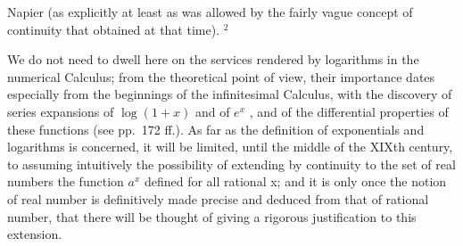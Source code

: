 Napier (as explicitly at least as was allowed by the fairly vague concept of continuity that obtained at that time). \(^{2}\)

We do not need to dwell here on the services rendered by logarithms in the numerical Calculus; from the theoretical point of view, their importance dates especially from the beginnings of the infinitesimal Calculus, with the discovery of series expansions of \(\log(1+x)\) and of \(e^{x}\) , and of the differential properties of these functions (see pp.~172 ff.). As far as the definition of exponentials and logarithms is concerned, it will be limited, until the middle of the XIXth century, to assuming intuitively the possibility of extending by continuity to the set of real numbers the function \(a^{x}\) defined for all rational x; and it is only once the notion of real number is definitively made precise and deduced from that of rational number, that there will be thought of giving a rigorous justification to this extension.

